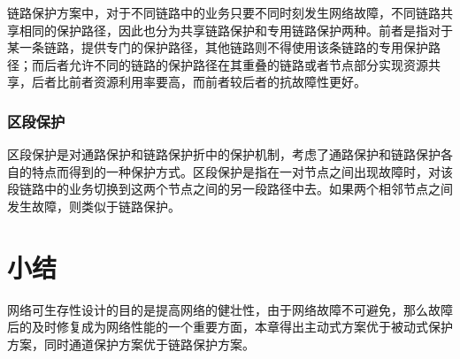 链路保护方案中，对于不同链路中的业务只要不同时刻发生网络故障，不同链路共享相同的保护路径，因此也分为共享链路保护和专用链路保护两种。前者是指对于某一条链路，提供专门的保护路径，其他链路则不得使用该条链路的专用保护路径；而后者允许不同的链路的保护路径在其重叠的链路或者节点部分实现资源共享，后者比前者资源利用率要高，而前者较后者的抗故障性更好。
\subsubsection{区段保护}
区段保护是对通路保护和链路保护折中的保护机制，考虑了通路保护和链路保护各自的特点而得到的一种保护方式。区段保护是指在一对节点之间出现故障时，对该段链路中的业务切换到这两个节点之间的另一段路径中去。如果两个相邻节点之间发生故障，则类似于链路保护。
\section{小结}
网络可生存性设计的目的是提高网络的健壮性，由于网络故障不可避免，那么故障后的及时修复成为网络性能的一个重要方面，本章得出主动式方案优于被动式保护方案，同时通道保护方案优于链路保护方案。



